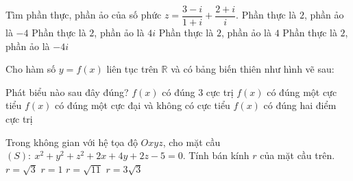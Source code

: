 \begin{ex}%
Tìm phần thực, phần ảo của số phức $z=\dfrac{3-i}{1+i}+\dfrac{2+i}{i}$.
\choice
{\True Phần thực là $2$, phần ảo là $-4$}
{Phần thực là $2$, phần ảo là $4i$}
{Phần thực là $2$, phần ảo là $4$}
{Phần thực là $2$, phần ảo là $-4i$}
\end{ex}

\begin{ex}%
Cho hàm số $y=f(x)$ liên tục trên $\mathbb{R}$ và có bảng biến thiên như hình vẽ sau:
\begin{center}
\end{center}
Phát biểu nào sau đây đúng?
\choice
{$f(x)$ có đúng $3$ cực trị}
{$f(x)$ có đúng một cực tiểu}
{\True $f(x)$ có đúng một cực đại và không có cực tiểu}
{$f(x)$ có đúng hai điểm cực trị}
\end{ex}

\begin{ex}%
Trong không gian với hệ tọa độ $Oxyz$, cho mặt cầu $(S):\ x^2+y^2+z^2+2x+4y+2z-5=0$. Tính bán kính $r$ của mặt cầu trên.
\choice
{$r=\sqrt{3}$}
{$r=1$}
{\True $r=\sqrt{11}$}
{$r=3\sqrt{3}$}
\end{ex}

